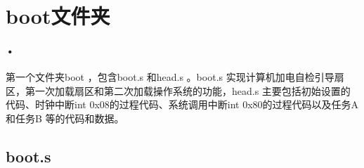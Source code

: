\documentclass[12pt]{article}
\begin{document}
%    

\section{boot文件夹}
\paragraph{•}
第一个文件夹boot ，包含boot.s 和head.s 。boot.s 实现计算机加电自检引导扇区，第一次加载扇区和第二次加载操作系统的功能，head.s 主要包括初始设置的代码、时钟中断int 0x08的过程代码、系统调用中断int 0x80的过程代码以及任务A 和任务B 等的代码和数据。 
\subsection{boot.s}
\end{document}
